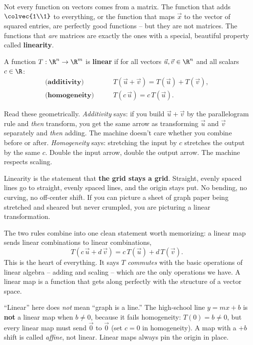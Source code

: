Not every function on vectors comes from a matrix. The function that adds
$\colvec{1\\1}$ to everything, or the function that maps $\vec{x}$ to the vector
of squared entries, are perfectly good functions -- but they are not matrices.
The functions that \emph{are} matrices are exactly the ones with a special,
beautiful property called \textbf{linearity}.

\begin{definition}
\label{ch05:def-linear}
A function $T : \R^n \to \R^m$ is \textbf{linear} if for all vectors
$\vec{u}, \vec{v} \in \R^n$ and all scalars $c \in \R$:
\begin{align*}
  \textbf{(additivity)} \qquad & T(\vec{u} + \vec{v}) = T(\vec{u}) + T(\vec{v}), \\
  \textbf{(homogeneity)} \qquad & T(c\,\vec{u}) = c\,T(\vec{u}).
\end{align*}
\end{definition}

Read these geometrically. \emph{Additivity} says: if you build $\vec{u}+\vec{v}$
by the parallelogram rule and \emph{then} transform, you get the same arrow as
transforming $\vec{u}$ and $\vec{v}$ separately and \emph{then} adding. The
machine doesn't care whether you combine before or after.
\emph{Homogeneity} says: stretching the input by $c$ stretches the output by the
same $c$. Double the input arrow, double the output arrow. The machine respects
scaling.

\begin{intuitionbox}
Linearity is the statement that \textbf{the grid stays a grid}. Straight,
evenly spaced lines go to straight, evenly spaced lines, and the origin stays
put. No bending, no curving, no off-center shift. If you can picture a sheet of
graph paper being stretched and sheared but never crumpled, you are picturing a
linear transformation.
\end{intuitionbox}

The two rules combine into one clean statement worth memorizing: a linear map
sends linear combinations to linear combinations,
\[
  T(c\,\vec{u} + d\,\vec{v}) = c\,T(\vec{u}) + d\,T(\vec{v}).
\]
This is the heart of everything. It says $T$ \emph{commutes} with the basic
operations of linear algebra -- adding and scaling -- which are the only
operations we have. A linear map is a function that gets along perfectly with the
structure of a vector space.

\begin{trapbox}
``Linear'' here does \emph{not} mean ``graph is a line.'' The high-school line
$y = mx + b$ is \textbf{not} a linear map when $b \neq 0$, because it fails
homogeneity: $T(0) = b \neq 0$, but every linear map must send $\vec{0}$ to
$\vec{0}$ (set $c = 0$ in homogeneity). A map with a $+b$ shift is called
\emph{affine}, not linear. Linear maps always pin the origin in place.
\end{trapbox}

